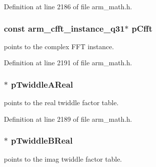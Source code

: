 Definition at line 2186 of file arm\+\_\+math.\+h.

\subsubsection[{\texorpdfstring{p\+Cfft}{pCfft}}]{\setlength{\rightskip}{0pt plus 5cm}const {\bf arm\+\_\+cfft\+\_\+instance\+\_\+q31}$\ast$ p\+Cfft}\hypertarget{structarm__rfft__instance__q31_aa583d759b8b176ad1696b27eb5821daf}{}\label{structarm__rfft__instance__q31_aa583d759b8b176ad1696b27eb5821daf}
points to the complex F\+FT instance. 

Definition at line 2191 of file arm\+\_\+math.\+h.

\subsubsection[{\texorpdfstring{p\+Twiddle\+A\+Real}{pTwiddleAReal}}]{$\ast$ p\+Twiddle\+A\+Real}\hypertarget{structarm__rfft__instance__q31_a059faa282f9186687d843ead4a7a0d7e}{}\label{structarm__rfft__instance__q31_a059faa282f9186687d843ead4a7a0d7e}
points to the real twiddle factor table. 

Definition at line 2189 of file arm\+\_\+math.\+h.

\subsubsection[{\texorpdfstring{p\+Twiddle\+B\+Real}{pTwiddleBReal}}]{$\ast$ p\+Twiddle\+B\+Real}\hypertarget{structarm__rfft__instance__q31_a611c385424ce77519f599980f96d5846}{}\label{structarm__rfft__instance__q31_a611c385424ce77519f599980f96d5846}
points to the imag twiddle factor table. 

